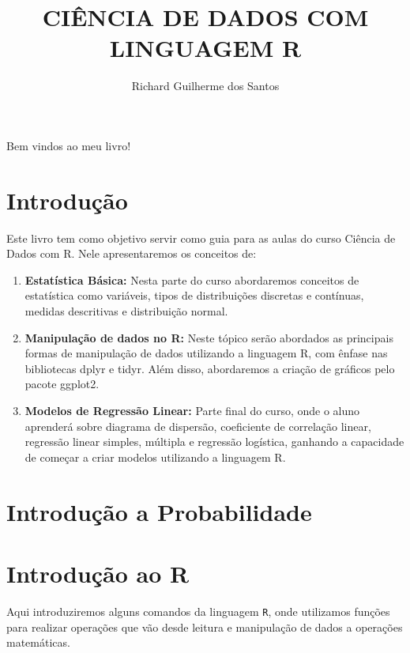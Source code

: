 \documentclass[
]{book}
\title{CIÊNCIA DE DADOS COM LINGUAGEM R}
\author{Richard Guilherme dos Santos}
\date{}
\providecommand{\tightlist}{%
  \setlength{\itemsep}{0pt}\setlength{\parskip}{0pt}}
\begin{document}
\maketitle

{
\setcounter{tocdepth}{1}
\tableofcontents
}
Bem vindos ao meu livro!

\hypertarget{introduuxe7uxe3o}{%
\chapter{Introdução}\label{introduuxe7uxe3o}}

Este livro tem como objetivo servir como guia para as aulas do curso Ciência de Dados com R. Nele apresentaremos os conceitos de:

\begin{enumerate}
\def\labelenumi{\arabic{enumi}.}
\tightlist
\item
  \textbf{Estatística Básica:} Nesta parte do curso abordaremos conceitos de estatística como variáveis, tipos de distribuições discretas e contínuas, medidas descritivas e distribuição normal.
\item
  \textbf{Manipulação de dados no R:} Neste tópico serão abordados as principais formas de manipulação de dados utilizando a linguagem R, com ênfase nas bibliotecas dplyr e tidyr. Além disso, abordaremos a criação de gráficos pelo pacote ggplot2.
\item
  \textbf{Modelos de Regressão Linear:} Parte final do curso, onde o aluno aprenderá sobre diagrama de dispersão, coeficiente de correlação linear, regressão linear simples, múltipla e regressão logística, ganhando a capacidade de começar a criar modelos utilizando a linguagem R.
\end{enumerate}

\hypertarget{introduuxe7uxe3o-a-probabilidade}{%
\chapter{Introdução a Probabilidade}\label{introduuxe7uxe3o-a-probabilidade}}

\hypertarget{introduuxe7uxe3o-ao-r}{%
\chapter{Introdução ao R}\label{introduuxe7uxe3o-ao-r}}

Aqui introduziremos alguns comandos da linguagem \texttt{R}, onde utilizamos funções para realizar operações que vão desde leitura e manipulação de dados a operações matemáticas.
\end{document}

